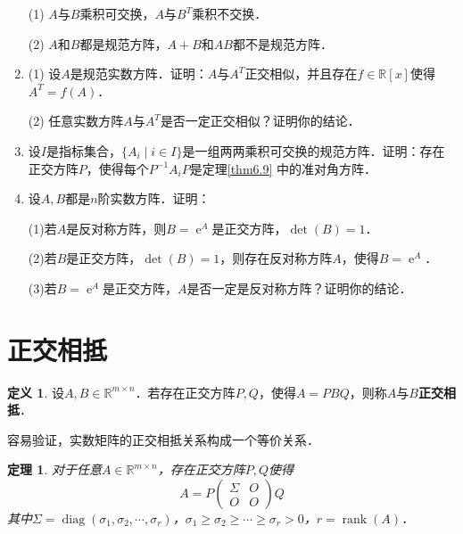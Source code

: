 \documentclass[a4paper,fontset=windows]{ctexbook}
\newtheorem{theorem}{定理}[chapter]
\theoremstyle{definition}
\newtheorem{definition}{定义}[chapter]
\DeclareMathOperator{\diag}{diag}
\DeclareMathOperator{\E}{e}
\DeclareMathOperator{\rank}{rank}
\renewcommand{\ge}{\geqslant}
\begin{document}
\begin{enumerate}
(1) $A$与$B$乘积可交换，$A$与$B^T$乘积不交换．

(2) $A$和$B$都是规范方阵，$A+B$和$AB$都不是规范方阵．

\item (1) 设$A$是规范实数方阵．证明：$A$与$A^T$正交相似，并且存在$f\in\mathbb{R}[x]$使得$A^T=f(A)$．

(2) 任意实数方阵$A$与$A^T$是否一定正交相似？证明你的结论．

\item 设$I$是指标集合，$\{A_i\mid i\in I\}$是一组两两乘积可交换的规范方阵．证明：存在正交方阵$P$，使得每个$P^{-1}A_iP$是定理\ref{thm6.9} 中的准对角方阵．

\item 设$A,B$都是$n$阶实数方阵．证明：

(1)若$A$是反对称方阵，则$B=\E^A$是正交方阵，$\det(B)=1$．

(2)若$B$是正交方阵，$\det(B)=1$，则存在反对称方阵$A$，使得$B=\E^A$．

(3)若$B=\E^A$是正交方阵，$A$是否一定是反对称方阵？证明你的结论．

\end{enumerate}

\clearpage\section{正交相抵}

\begin{definition}
设$A,B\in\mathbb{R}^{m\times n}$．若存在正交方阵$P,Q$，使得$A=PBQ$，则称$A$与$B${\bf 正交相抵}．
\end{definition}

容易验证，实数矩阵的正交相抵关系构成一个等价关系．

\begin{theorem}
对于任意$A\in\mathbb{R}^{m\times n}$，存在正交方阵$P,Q$使得
\begin{equation}\label{eq6.3}
A=P\begin{pmatrix}\Sigma&O \\ O&O\end{pmatrix}Q
\end{equation}
其中$\Sigma=\diag(\sigma_1,\sigma_2,\cdots,\sigma_r)$，$\sigma_1\ge\sigma_2\ge\cdots\ge\sigma_r>0$，$r=\rank(A)$．
\end{theorem}
\end{document}
